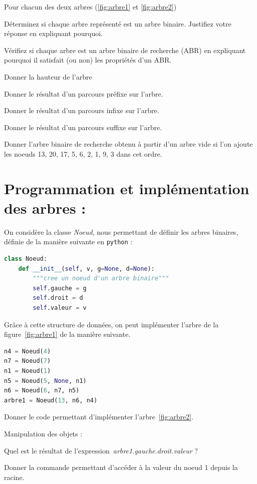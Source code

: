 \documentclass[a4paper, noanswers, addpoints, 12pt]{exam}
\begin{document}
\begin{questions}
\question[3] Pour chacun des deux arbres (\ref{fig:arbre1} et \ref{fig:arbre2})
\begin{parts}
    \item Déterminez si chaque arbre représenté est un arbre binaire. Justifiez votre réponse en expliquant pourquoi.
    \item Vérifiez si chaque arbre est un arbre binaire de recherche (ABR) en expliquant pourquoi il satisfait (ou non) les propriétés d'un ABR.
    \item Donner la hauteur de l'arbre
    \item Donner le résultat d'un parcours préfixe sur l'arbre.
    \item Donner le résultat d'un parcours infixe sur l'arbre.
    \item Donner le résultat d'un parcours suffixe sur l'arbre.
\end{parts}

\question[2] Donner l'arbre binaire de recherche obtenu à partir d'un arbre vide si l'on ajoute les noeuds 13, 20, 17, 5, 6, 2, 1, 9, 3 dans cet ordre.

\vspace{1cm}

\section{Programmation et implémentation des arbres : }

On considère la classe \textit{Noeud}, nous permettant de définir les arbres binaires, définie de la manière suivante en {\tt python} :

\begin{lstlisting}[style=mystyle, language=Python]
class Noeud:
    def __init__(self, v, g=None, d=None):
        """cree un noeud d'un arbre binaire"""
        self.gauche = g
        self.droit = d
        self.valeur = v
\end{lstlisting}

Grâce à cette structure de données, on peut implémenter l'arbre de la figure~\ref{fig:arbre1} de la manière suivante.
\begin{lstlisting}[style=mystyle, language=Python]
n4 = Noeud(4)
n7 = Noeud(7)
n1 = Noeud(1)
n5 = Noeud(5, None, n1)
n6 = Noeud(6, n7, n5)
arbre1 = Noeud(13, n6, n4)
\end{lstlisting}

\question[3] Donner le code permettant d'implémenter l'arbre~\ref{fig:arbre2}.

\question[1] Manipulation des objets :
\begin{parts}
    \item Quel est le résultat de l’expression~\textit{arbre1.gauche.droit.valeur} ?
    \item Donner la commande permettant d'accéder à la valeur du noeud 1 depuis la racine.
\end{parts}


\end{questions}
\end{document}
